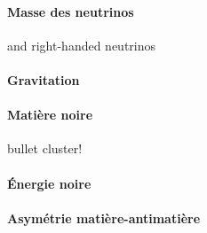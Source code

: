 \paragraph{Masse des neutrinos}and right-handed neutrinos
\paragraph{Gravitation}
\paragraph{Matière noire}
bullet cluster!\cite{Clowe_2006}
\paragraph{Énergie noire}
\paragraph{Asymétrie matière-antimatière}
